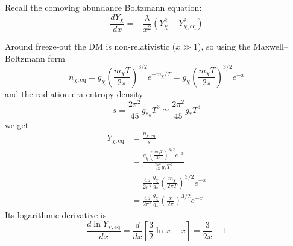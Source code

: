 \bigskip \noindent
\begin{foundation}
    Recall the comoving abundance Boltzmann equation:
    \[
        \frac{dY_\chi}{dx} = - \frac{\lambda}{x^2} (Y_\chi^2 - Y_{\chi,\mathrm{eq}}^2)
    \]

    Around freeze-out the DM is non-relativistic ($x\gg 1$), so using the Maxwell--Boltzmann form
    \[
        n_{\chi,\mathrm{eq}}=g_\chi\left(\frac{m_\chi T}{2\pi}\right)^{3/2}e^{-m_\chi/T}=g_\chi\left(\frac{m_\chi T}{2\pi}\right)^{3/2}e^{-x}
    \]
    and the radiation-era entropy density
    \[
        s=\frac{2\pi^2}{45}g_{*s}T^3\simeq\frac{2\pi^2}{45}g_*T^3
    \]
    we get
    \begin{align*}
        Y_{\chi,\mathrm{eq}} &= \frac{n_{\chi,\mathrm{eq}}}{s} \\
        &=\frac{g_\chi\left(\frac{m_\chi T}{2\pi}\right)^{3/2}e^{-x}}{\frac{2\pi^2}{45}g_*T^3} \\
        &=\frac{45}{2\pi^2}\frac{g_\chi}{g_*}\left(\frac{m_\chi}{2\pi T}\right)^{3/2}e^{-x} \\
        &=\frac{45}{2\pi^2}\frac{g_\chi}{g_*}\left(\frac{x}{2\pi}\right)^{3/2}e^{-x}
    \end{align*}
    Its logarithmic derivative is
    \[
        \frac{d\ln Y_{\chi,\mathrm{eq}}}{dx}=\frac{d}{dx}\left[\frac{3}{2}\ln x - x\right]=\frac{3}{2x}-1
    \]


\end{foundation}
